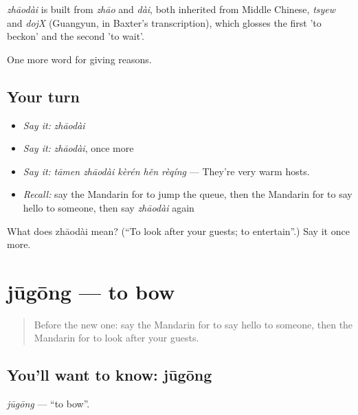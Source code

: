 \begin{cousinweb}
\emph{zhāodài} is built from \emph{zhāo} and \emph{dài}, both inherited from Middle Chinese, \emph{tsyew} and \emph{dojX} (Guangyun, in Baxter's transcription), which glosses the first 'to beckon' and the second 'to wait'.
\end{cousinweb}

\begin{grammarlens}[title={What you've built}]
One more word for giving reasons.
\end{grammarlens}

\subsection*{Your turn}
\begin{itemize}
\raggedright
  \item \emph{Say it:} \emph{zhāodài}
  \item \emph{Say it:} \emph{zhāodài}, once more
  \item \emph{Say it:} \emph{tāmen zhāodài kèrén hěn rèqíng} — They're very warm hosts.
  \item \emph{Recall:} say the Mandarin for to jump the queue, then the Mandarin for to say hello to someone, then say \emph{zhāodài} again
\end{itemize}

\begin{tcolorbox}[breakable,colback=teal!4,colframe=teal!35!black,title={Before you move on}]
What does zhāodài mean? (\textquotedblleft{}To look after your guests; to entertain\textquotedblright{}.) Say it once more.
\end{tcolorbox}
\section[jūgōng]{jūgōng — to bow}

\label{lesson:ZH-C361-jugong}



\begin{quote}
Before the new one: say the Mandarin for to say hello to someone, then the Mandarin for to look after your guests.
\end{quote}

\subsection*{You'll want to know: jūgōng}
\emph{jūgōng} — \textquotedblleft{}to bow\textquotedblright{}.

